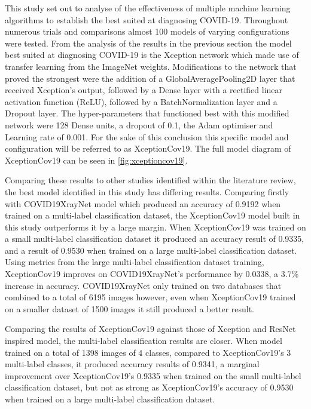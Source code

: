 This study set out to analyse of the effectiveness of multiple machine learning algorithms to establish the best suited at diagnosing COVID-19. Throughout numerous trials and comparisons almost 100 models of varying configurations were tested. From the analysis of the results in the previous section the model best suited at diagnosing COVID-19 is the Xception network which made use of transfer learning from the ImageNet weights. Modifications to the network that proved the strongest were the addition of a GlobalAveragePooling2D layer that received Xception’s output, followed by a Dense layer with a rectified linear activation function (ReLU), followed by a BatchNormalization layer and a Dropout layer. The hyper-parameters that functioned best with this modified network were 128 Dense units, a dropout of 0.1, the Adam optimiser and Learning rate of 0.001. For the sake of this conclusion this specific model and configuration will be referred to as XceptionCov19. The full model diagram of XceptionCov19 can be seen in \autoref{fig:xceptioncov19}.

Comparing these results to other studies identified within the literature review, the best model identified in this study has differing results. Comparing firstly with \cite{zhang2020covid19xraynet} COVID19XrayNet model which produced an accuracy of 0.9192 when trained on a multi-label classification dataset, the XceptionCov19 model built in this study outperforms it by a large margin. When XceptionCov19 was trained on a small multi-label classification dataset it produced an accuracy result of 0.9335, and a result of 0.9530 when trained on a large multi-label classification dataset. Using metrics from the large multi-label classification dataset training, XceptionCov19 improves on COVID19XrayNet's performance by 0.0338, a 3.7\% increase in accuracy. COVID19XrayNet only trained on two databases that combined to a total of 6195 images however, even when XceptionCov19 trained on a smaller dataset of 1500 images it still produced a better result.

Comparing the results of XceptionCov19 against those of \cite{fitriasari2021improvement} Xception and ResNet inspired model, the multi-label classification results are closer. When \cite{fitriasari2021improvement} model trained on a total of 1398 images of 4 classes, compared to XceptionCov19's 3 multi-label classes, it produced accuracy results of 0.9341, a marginal improvement over XceptionCov19's 0.9335 when trained on the small multi-label classification dataset, but not as strong as XceptionCov19's accuracy of 0.9530 when trained on a large multi-label classification dataset.

